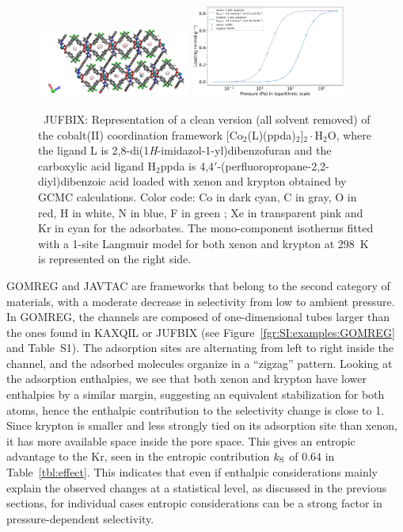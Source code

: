 \documentclass[main.tex]{subfiles}
\begin{document}
  \begin{figure}[h]
    \centering
      \includegraphics[width=0.45\textwidth]{figures/2-thermo/JUFBIX_clean.jpg}
      \includegraphics[width=0.45\textwidth]{figures/2-thermo/JUFBIX_clean_isotherm_xenon_krypton_298K.jpg}
      \caption{\ JUFBIX: Representation of a clean version (all solvent removed) of the cobalt(II) coordination framework [Co$_2$(L)(ppda)$_2$]$_2\cdot$H$_2$O, where the ligand L is 2,8-di(1\emph{H}-imidazol-1-yl)dibenzofuran and the carboxylic acid ligand H$_2$ppda is 4,$4'$-(perfluoropropane-2,2-diyl)dibenzoic acid loaded with xenon and krypton obtained by GCMC calculations. Color code: Co in dark cyan, C in gray, O in red, H in white, N in blue, F in green ; Xe in transparent pink and Kr in cyan for the adsorbates. The mono-component isotherms fitted with a 1-site Langmuir model for both xenon and krypton at \SI{298}{\kelvin} is represented on the right side.}
      \label{fgr:SI:examples:JUFBIX}
    \end{figure}
  
  GOMREG and JAVTAC are frameworks that belong to the second category of materials, with a moderate decrease in selectivity from low to ambient pressure. In GOMREG, the channels are composed of one-dimensional tubes larger than the ones found in KAXQIL or JUFBIX (see Figure~\ref{fgr:SI:examples:GOMREG} and Table~S1). The adsorption sites are alternating from left to right inside the channel, and the adsorbed molecules organize in a ``zigzag'' pattern. Looking at the adsorption enthalpies, we see that both xenon and krypton have lower enthalpies by a similar margin, suggesting an equivalent stabilization for both atoms, hence the enthalpic contribution to the selectivity change is close to 1.
  Since krypton is smaller and less strongly tied on its adsorption site than xenon, it has more available space inside the pore space. This gives an entropic advantage to the Kr, seen in the entropic contribution $k_{\text{S}}$ of $0.64$ in Table~\ref{tbl:effect}. This indicates that even if enthalpic considerations mainly explain the observed changes at a statistical level, as discussed in the previous sections, for individual cases entropic considerations can be a strong factor in pressure-dependent selectivity.
  
\end{document}
